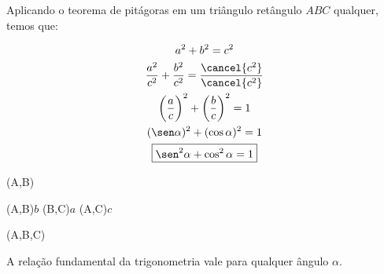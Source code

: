 \begin{minipage}{\textwidth}
	Aplicando o teorema de pitágoras em um triângulo retângulo $ABC$ qualquer, temos que:
	\nopagebreak
	\begin{multicols}{2}
		\begin{gather*}
			a^2+b^2=c^2\\
			\frac{a^2}{c^2}+\frac{b^2}{c^2}=\frac{\cancel{c^2}}{\cancel{c^2}}\\
			\left(\vphantom{\dfrac{b}c}\dfrac{a}c\right)^2 +\left(\frac{b}{c}\right)^2=1\\
			(\sen \alpha)^2+(\cos \alpha)^2=1\\
			\boxed{\sen^2 \alpha + \cos^2 \alpha=1}
		\end{gather*}
		\vfill\null
		\columnbreak
		\vfill\null
		\begin{tikzscale}[0.8]
			\tkzDrawTriangle[pythagore](A,B)

			\tkzLabelSegment[below=2pt, xshift=3pt](A,B){$b$}
			\tkzLabelSegment[right=2pt, yshift=-2pt](B,C){$a$}
			(A,C){$c$}

			\tkzMarkRightAngle[line width=0.3pt](A,B,C)
		\end{tikzscale}
	\end{multicols}

	A relação fundamental da trigonometria vale para qualquer ângulo $\alpha$.
\end{minipage}

